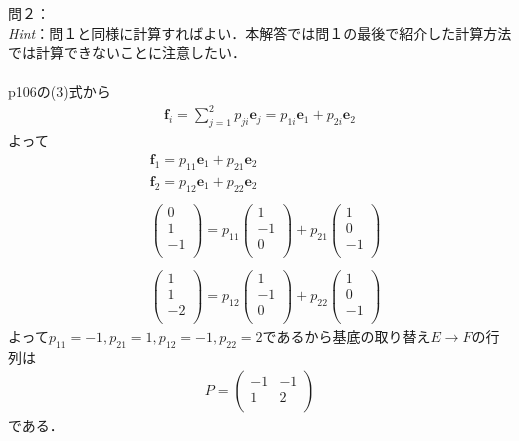 \documentclass[dvipdfmx,uplatex,11pt]{jsarticle}
\theoremstyle{definition}
\begin{document}
問２： \\
\textsl{Hint}：問１と同様に計算すればよい．本解答では問１の最後で紹介した計算方法では計算できないことに注意したい．\\ \\
p106の(3)式から
\begin{eqnarray*}
\bm{f}_i=\sum^{2}_{j=1}p_{ji}\bm{e}_{j}=p_{1i}\bm{e}_1+p_{2i}\bm{e}_2
\end{eqnarray*}
よって
\begin{eqnarray*}
& \bm{f}_1=p_{11}\bm{e}_1+p_{21}\bm{e}_2 \\
& \bm{f}_2=p_{12}\bm{e}_1+p_{22}\bm{e}_2 \\ \\
&
\begin{pmatrix}
0 \\
1 \\
-1 \\
\end{pmatrix}
=
p_{11}
\begin{pmatrix}
1 \\
-1 \\
0 \\
\end{pmatrix}
+p_{21}
\begin{pmatrix}
1 \\
0 \\
-1 \\
\end{pmatrix}
\\ \\
&
\begin{pmatrix}
1 \\
1 \\
-2 \\
\end{pmatrix}
=
p_{12}
\begin{pmatrix}
1 \\
-1 \\
0 \\
\end{pmatrix}
+p_{22}
\begin{pmatrix}
1 \\
0 \\
-1 \\
\end{pmatrix}
\end{eqnarray*}
よって$p_{11}=-1,p_{21}=1,p_{12}=-1,p_{22}=2$であるから基底の取り替え$E→F$の行列は
\begin{eqnarray*}
P=
\begin{pmatrix}
-1 & -1 \\
1 & 2 \\
\end{pmatrix}
\end{eqnarray*}
である．
%
%
%
\newpage
%
%
%
\end{document}
